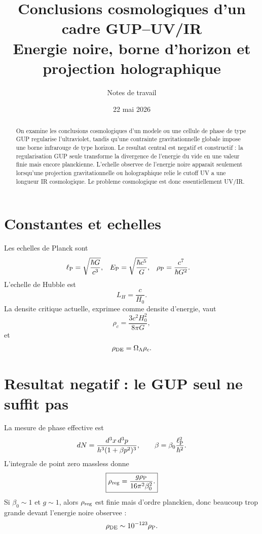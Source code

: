 \documentclass[11pt,a4paper]{article}
\title{Conclusions cosmologiques d'un cadre GUP--UV/IR\\
\large Energie noire, borne d'horizon et projection holographique}
\author{Notes de travail}
\date{22 mai 2026}
\newcommand{\rhoP}{\rho_{\rm P}}
\newcommand{\ellP}{\ell_{\rm P}}
\newcommand{\rhoDE}{\rho_{\rm DE}}
\newcommand{\rhoReg}{\rho_{\rm reg}}
\newcommand{\LH}{L_H}
\newcommand{\EP}{E_{\rm P}}
\begin{document}
\maketitle

\begin{abstract}
On examine les conclusions cosmologiques d'un modele ou une cellule de phase de
type GUP regularise l'ultraviolet, tandis qu'une contrainte gravitationnelle
globale impose une borne infrarouge de type horizon. Le resultat central est
negatif et constructif : la regularisation GUP seule transforme la divergence
de l'energie du vide en une valeur finie mais encore planckienne. L'echelle
observee de l'energie noire apparait seulement lorsqu'une projection
gravitationnelle ou holographique relie le cutoff UV a une longueur IR
cosmologique. Le probleme cosmologique est donc essentiellement UV/IR.
\end{abstract}

\section{Constantes et echelles}

Les echelles de Planck sont
\begin{align}
\ellP &= \sqrt{\frac{\hbar G}{c^3}},&
\EP &= \sqrt{\frac{\hbar c^5}{G}},&
\rhoP &= \frac{c^7}{\hbar G^2}.
\end{align}
L'echelle de Hubble est
\begin{equation}
\LH=\frac{c}{H_0}.
\end{equation}
La densite critique actuelle, exprimee comme densite d'energie, vaut
\begin{equation}
\rho_c=\frac{3c^2H_0^2}{8\pi G},
\end{equation}
et
\begin{equation}
\rhoDE=\Omega_\Lambda\rho_c.
\end{equation}

\section{Resultat negatif : le GUP seul ne suffit pas}

La mesure de phase effective est
\begin{equation}
dN=\frac{d^3x\,d^3p}{h^3(1+\beta p^2)^3},
\qquad
\beta=\beta_0\frac{\ellP^2}{\hbar^2}.
\end{equation}
L'integrale de point zero massless donne
\begin{equation}
\boxed{
\rhoReg=\frac{g\rhoP}{16\pi^2\beta_0^2}.
}
\label{eq:rho_reg}
\end{equation}
Si $\beta_0\sim1$ et $g\sim1$, alors $\rhoReg$ est finie mais d'ordre
planckien, donc beaucoup trop grande devant l'energie noire observee :
\begin{equation}
\rhoDE\sim10^{-123}\rhoP.
\end{equation}
\end{document}
